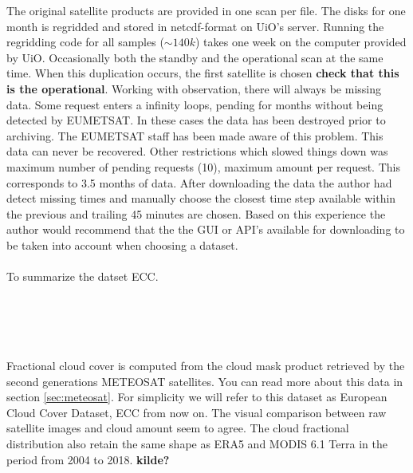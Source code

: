 The original satellite products are provided in one scan per file. The disks for one month is regridded and stored in \acrshort{netcdf}-format on UiO's server. Running the regridding code for all samples ($\sim 140k$) takes one week on the computer provided by UiO. Occasionally both the standby and the operational scan at the same time. When this duplication occurs, the first satellite is chosen \textbf{check that this is the operational}. Working with observation, there will always be missing data. Some request enters a infinity loops, pending for months without being detected by EUMETSAT. In these cases the data has been destroyed prior to archiving. The EUMETSAT staff has been made aware of this problem. This data can never be recovered. Other restrictions which slowed things down was maximum number of pending requests (10), maximum amount per request. This corresponds to 3.5 months of data. After downloading the data the author had detect missing times and manually choose the closest time step available within the previous and trailing 45 minutes are chosen. Based on this experience the author would recommend that the the GUI or API's available for downloading to be taken into account when choosing a dataset. \\ \\

To summarize the datset ECC. 

\\ \\

\\ \\
Fractional cloud cover is computed from the cloud mask product retrieved by the second generations METEOSAT satellites. You can read more about this data in section \ref{sec:meteosat}. For simplicity we will refer to this dataset as European Cloud Cover Dataset, ECC from now on. The visual comparison between raw satellite images and cloud amount seem to agree. The cloud fractional distribution also retain the same shape as ERA5 and MODIS 6.1 Terra in the period from 2004 to 2018. \textbf{kilde?}
\\ \\



